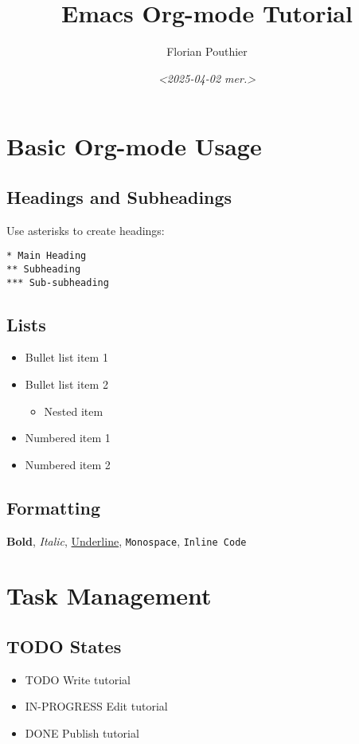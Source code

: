 \documentclass[11pt]{article}
\author{Florian Pouthier}
\date{\textit{<2025-04-02 mer.>}}
\title{Emacs Org-mode Tutorial}
\begin{document}
\maketitle
\tableofcontents


\section{Basic Org-mode Usage}
\label{sec:org443f9ea}

\subsection{Headings and Subheadings}
\label{sec:org24e62ac}
Use asterisks to create headings:
\begin{verbatim}
* Main Heading
** Subheading
*** Sub-subheading
\end{verbatim}

\subsection{Lists}
\label{sec:org5046039}
\begin{itemize}
\item Bullet list item 1
\item Bullet list item 2
\begin{itemize}
\item Nested item
\end{itemize}
\item Numbered item 1
\item Numbered item 2
\end{itemize}

\subsection{Formatting}
\label{sec:org1299e01}
\textbf{Bold}, \emph{Italic}, \uline{Underline}, \texttt{Monospace}, \texttt{Inline Code}

\section{Task Management}
\label{sec:org608c041}

\subsection{{\bfseries\sffamily TODO} States}
\label{sec:org826fd3f}
\begin{itemize}
\item TODO Write tutorial
\item IN-PROGRESS Edit tutorial
\item DONE Publish tutorial
\end{itemize}
\end{document}
